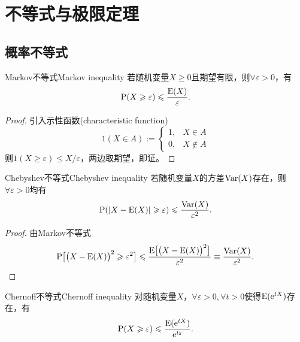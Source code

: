 \chapter{不等式与极限定理}

\section{概率不等式}

\begin{theorem}{Markov不等式}{Markov inequality}
	若随机变量$X \geqslant 0$且期望有限，则$\forall\varepsilon > 0$，有
	\begin{equation}
		\label{eqn:Markov ineq}
		\operatorname{P}(X \geqslant \varepsilon) \leqslant \frac{\operatorname{E}(X)}\varepsilon.
	\end{equation}
\end{theorem}

\begin{proof}
	引入示性函数(characteristic function)
	\begin{equation}
		1(X \in A) := \begin{cases}
			1,&X \in A\\
			0,&X \notin A
		\end{cases}
	\end{equation}
	则$1(X \geqslant \varepsilon) \leqslant X/\varepsilon$，两边取期望，即证。
\end{proof}

\begin{theorem}{Chebyshev不等式}{Chebyshev inequality}
	若随机变量$X$的方差$\operatorname{Var}(X)$存在，则$\forall\varepsilon > 0$均有
	\begin{equation}
		\operatorname{P}(\lvert X - \operatorname{E}(X)\rvert \geqslant \varepsilon) \leqslant \frac{\operatorname{Var}(X)}{\varepsilon^2}.
	\end{equation}
\end{theorem}

\begin{proof}
	由Markov不等式
	\[
		\operatorname{P}\bigl[\bigl(X - \operatorname{E}(X)\bigr)^2 \geqslant \varepsilon^2\bigr] \leqslant \frac{\operatorname{E}\bigl[\bigl(X - \operatorname{E}(X)\bigr)^2\bigr]}{\varepsilon^2} \equiv \frac{\operatorname{Var}(X)}{\varepsilon^2}.
		\qedhere
	\]
\end{proof}

\begin{theorem}{Chernoff不等式}{Chernoff inequality}
	对随机变量$X$，$\forall\varepsilon > 0,\forall t > 0$使得$\operatorname{E}(\mathop{}\!\mathrm{e}^{tX})$存在，有
	\begin{equation}
		\operatorname{P}(X \geqslant \varepsilon) \leqslant \frac{\operatorname{E}(\mathop{}\!\mathrm{e}^{tX})}{\mathop{}\!\mathrm{e}^{t\varepsilon}}.
	\end{equation}
\end{theorem}

